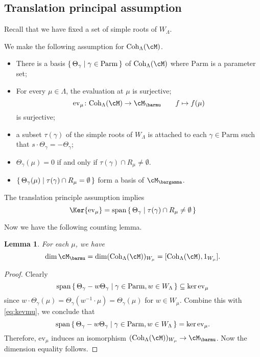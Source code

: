 \documentclass[12pt,a4paper]{amsart}
\numberwithin{equation}{section}
\newtheorem{lem}[thm]{Lemma}
\theoremstyle{remark}
\DeclareMathOperator{\sspan}{span}
\def\Coh{\mathrm{Coh}}
\def\ev#1{{\mathrm{ev}_{#1}}}
\begin{document}
\def\Parm{\mathrm{Parm}}
\def\cof{\Theta}
\subsection*{Translation principal assumption}
Recall that we have fixed a set of simple roots of $W_\Lambda$.

We make the following assumption for $\Coh_\Lambda(\cM)$.
\begin{itemize}
\item There is a basis $\set{\cof_\gamma|\gamma\in \Parm}$ of
$\Coh_\Lambda(\cM)$ where $\Parm$ is a parameter set;
\item For every $\mu\in \Lambda$, the evaluation at $\mu$ is surjective;
  \[
    \ev{\mu}\colon \Coh_\Lambda(\cM)\rightarrow \cM_{\barmu} \qquad f\mapsto f(\mu)
  \]
  is surjective;
\item a subset $\tau(\gamma)$ of the simple roots of $W_\Lambda$ is attached
to each $\gamma\in \Parm$ such that $s\cdot \cof_\gamma = - \cof_\gamma$;
\item $\cof_\gamma(\mu) =0$ if and only if $\tau(\gamma)\cap R_\mu \neq \emptyset$.
\item $\set{\cof_\gamma(\mu)| \tau(\gamma)\cap R_\mu = \emptyset}$ form a basis of
$\cM_{\bargamma}$.
\end{itemize}

The translation principle assumption implies
\begin{equation}\label{eq:kevmu}
  \Ker\ev{\mu} = \sspan\set{{\cof}_{\gamma}|\tau(\gamma)\cap R_\mu \neq \emptyset } %
\end{equation}


\def\cohm{\Coh_\Lambda(\cM)}
Now we have the following counting lemma.
\begin{lem}
 For each $\mu$, we have
 \[
    \dim \cM_{\barmu}  = \dim (\cohm)_{W_\mu} = [\cohm, 1_{W_\mu}].
 \]
\end{lem}
\begin{proof}
  Clearly
  \[
  \sspan\set{\cof_\gamma - w\cof_\gamma | \gamma\in \Parm, w\in W_\Lambda} \subseteq \ker \ev{\mu}
  \]
  since $w\cdot \cof_\gamma(\mu) = \cof_\gamma(w^{-1}\cdot \mu)=\cof_\gamma(\mu)$ for $w\in W_\mu$.
  Combine this with \eqref{eq:kevmu}, we conclude that
  \[
   \sspan\set{\cof_\gamma - w\cof_\gamma | \gamma\in \Parm, w\in W_\Lambda} = \ker \ev{\mu}.
  \]
  Therefore, $\ev{\mu}$ induces an isomorphism $(\cohm)_{W_\mu}\rightarrow \cM_{\barmu}$.
  Now the dimension equality follows.
\end{proof}
\end{document}
